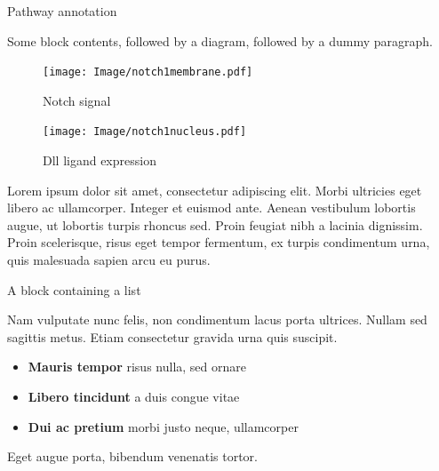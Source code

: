 \documentclass[final]{beamer}
\newlength{\sepwidth}
\newlength{\colwidth}
\newcommand{\separatorcolumn}{\begin{column}{\sepwidth}\end{column}}
\begin{document}
\begin{frame}[t]
\begin{columns}[t]
\separatorcolumn

\begin{column}{\colwidth}

  \begin{block}{Pathway annotation}

    Some block contents, followed by a diagram, followed by a dummy paragraph.

    \begin{figure}
      \centering
      \footnotesize
      \begin{minipage}{0.45\textwidth}
        \texttt{[image: Image/notch1membrane.pdf]}
        \caption{Notch signal}
      \end{minipage}
      \hspace{2.5cm}
      \begin{minipage}{0.45\textwidth}
        \texttt{[image: Image/notch1nucleus.pdf]}
        \caption{Dll ligand expression}
        \label{fig:li_in}
      \end{minipage}
    \end{figure}

    Lorem ipsum dolor sit amet, consectetur adipiscing elit. Morbi ultricies
    eget libero ac ullamcorper. Integer et euismod ante. Aenean vestibulum
    lobortis augue, ut lobortis turpis rhoncus sed. Proin feugiat nibh a
    lacinia dignissim. Proin scelerisque, risus eget tempor fermentum, ex
    turpis condimentum urna, quis malesuada sapien arcu eu purus.

  \end{block}

  \begin{block}{A block containing a list}

    Nam vulputate nunc felis, non condimentum lacus porta ultrices. Nullam sed
    sagittis metus. Etiam consectetur gravida urna quis suscipit.

    \begin{itemize}
      \item \textbf{Mauris tempor} risus nulla, sed ornare
      \item \textbf{Libero tincidunt} a duis congue vitae
      \item \textbf{Dui ac pretium} morbi justo neque, ullamcorper
    \end{itemize}

    Eget augue porta, bibendum venenatis tortor.


\end{block}
\end{column}
\end{columns}
\end{frame}
\end{document}
